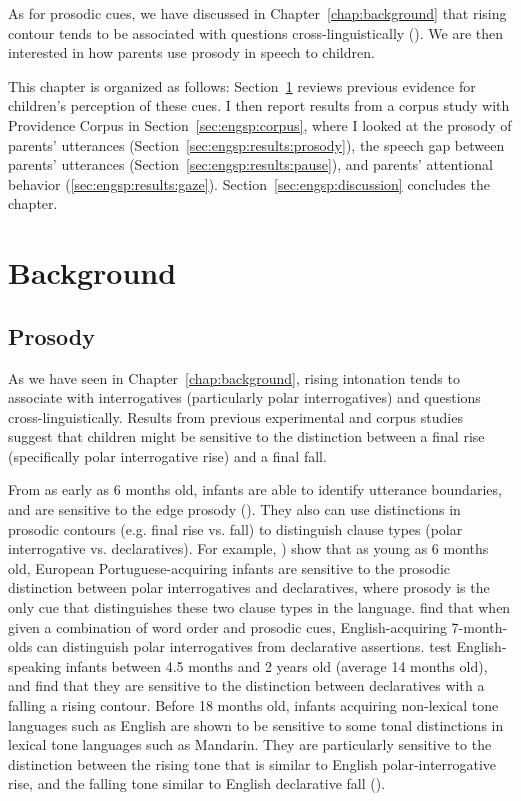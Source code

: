 As for prosodic cues, we have discussed in Chapter~\ref{chap:background} that rising contour tends to be associated with questions cross-linguistically (\cite{gussenhovenchen2000}). We are then interested in how parents use prosody in speech to children.

This chapter is organized as follows: Section~\ref{sec:engsp:background} reviews previous evidence for children's perception of these cues. I then report results from a corpus study with Providence Corpus in Section~\ref{sec:engsp:corpus}, where I looked at the prosody of parents' utterances (Section~\ref{sec:engsp:results:prosody}), the speech gap between parents' utterances (Section~\ref{sec:engsp:results:pause}), and parents' attentional behavior (\ref{sec:engsp:results:gaze}).
Section~\ref{sec:engsp:discussion} concludes the chapter.


\section{Background}
\label{sec:engsp:background}
\subsection{Prosody}
\label{sec:engsp:bg:prosody}
As we have seen in Chapter~\ref{chap:background}, rising intonation tends to associate with interrogatives (particularly polar interrogatives) and questions cross-linguistically. Results from previous experimental and corpus studies suggest that children might be sensitive to the distinction between a final rise (specifically polar interrogative rise) and a final fall. 

From as early as 6 months old, infants are able to identify utterance boundaries, and are sensitive to the edge prosody (\cite{johnson2014edge}). They also can use distinctions in prosodic contours (e.g. final rise vs. fall) to distinguish clause types (polar interrogative vs. declaratives). For example, \textcite{frota2014}) show that as young as 6 months old, European Portuguese-acquiring infants are sensitive to the prosodic distinction between polar interrogatives and declaratives, where prosody is the only cue that distinguishes these two clause types in the language. \textcite{geffenmintz2011} find that when given a combination of word order and prosodic cues, English-acquiring 7-month-olds can distinguish polar interrogatives from declarative assertions. \textcite{soderstrom2005clause} test English-speaking infants between 4.5 months and 2 years old (average 14 months old), and find that they are sensitive to the distinction between declaratives with a falling a rising contour. Before 18 months old, infants acquiring non-lexical tone languages such as English are shown to be sensitive to some tonal distinctions in lexical tone languages such as Mandarin. They are particularly sensitive to the distinction between the rising tone that is similar to English polar-interrogative rise, and the falling tone similar to English declarative fall (\cite{shi2017tone, Hay2019}).%

